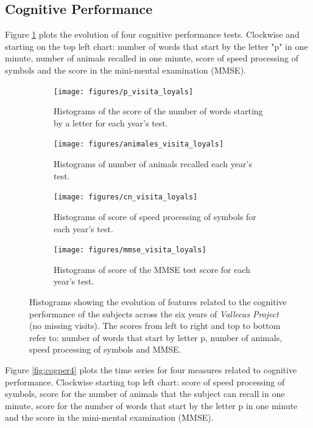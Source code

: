 \documentclass[11pt]{article}
\theoremstyle{definition}
\theoremstyle{remark}
\begin{document}
\subsection{Cognitive Performance}
\label{sse:cogper}
Figure \ref{fig:cogperyears} plots the evolution of four cognitive performance tests. Clockwise and starting on  the top left chart: number of words that start by the letter "p" in one minute, number of animals recalled in one minute, score of speed processing of symbols and the score in the mini-mental examination (MMSE).

\begin{figure}[H]
    \centering
    \begin{subfigure}[t]{0.4\textwidth}
        \centering
        \texttt{[image: figures/p\_visita\_loyals]}
        \caption{Histograms of the score of the number of words starting by a letter for each year's test.}
    \end{subfigure}
    \hfill
    \begin{subfigure}[t]{0.4\textwidth}
        \centering
        \texttt{[image: figures/animales\_visita\_loyals]}
        \caption{Histograms of number of animals recalled each year's test.}
    \end{subfigure}%
    
     \begin{subfigure}[t]{0.4\textwidth}
        \centering
        \texttt{[image: figures/cn\_visita\_loyals]}
        \caption{Histograms of score of speed processing of symbols for each year's test.}
    \end{subfigure}
    \hfill
    \begin{subfigure}[t]{0.4\textwidth}
        \centering
        \texttt{[image: figures/mmse\_visita\_loyals]}
        \caption{Histograms of score of the MMSE test score for each year's test.}
    \end{subfigure}%
    \caption{Histograms showing the evolution of features related to the cognitive performance of the subjects across the six years of \emph{Vallecas Project} (no missing visits). The scores from left to right and top to bottom refer to: number of words that start by letter p, number of animals, speed processing of symbols and MMSE.}
    \label{fig:cogperyears}
\end{figure}

Figure \ref{fig:cogper4} plots the time series for four measures related to cognitive performance. Clockwise starting top left chart: score of speed processing of symbols, score for the number of animals that the subject can recall in one minute, score for the number of words that start by the letter p in one minute and the score in the mini-mental examination (MMSE).
\end{document}
